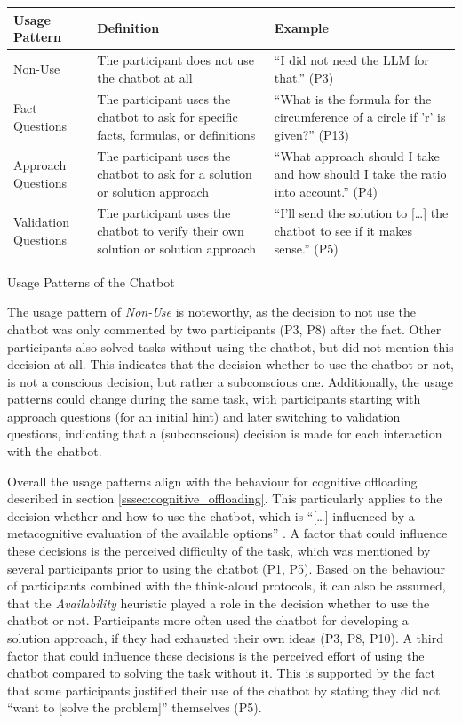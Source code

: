 \begin{ctable}
    \begin{tabularx}{\textwidth}{l|X|X}
        \textbf{Usage Pattern} & \textbf{Definition} & \textbf{Example} \\
        \hline
        Non-Use & The participant does not use the chatbot at all & “I did not need the LLM for that.” (P3) \\
        Fact Questions & The participant uses the chatbot to ask for specific facts, formulas, or definitions & “What is the formula for the circumference of a circle if 'r' is given?” (P13) \\
        Approach Questions & The participant uses the chatbot to ask for a solution or solution approach & “What approach should I take and how should I take the ratio into account.” (P4) \\
        Validation Questions & The participant uses the chatbot to verify their own solution or solution approach & “I'll send the solution to [\dots] the chatbot to see if it makes sense.” (P5)
    \end{tabularx}
    \caption{Usage Patterns of the Chatbot}
    \label{tab:usage_patterns}
\end{ctable}

The usage pattern of \textit{Non-Use} is noteworthy, as the decision to not use the chatbot was only commented by two participants (P3, P8) after the fact. Other participants also solved tasks without using the chatbot, but did not mention this decision at all. This indicates that the decision whether to use the chatbot or not, is not a conscious decision, but rather a subconscious one. Additionally, the usage patterns could change during the same task, with participants starting with approach questions (for an initial hint) and later switching to validation questions, indicating that a (subconscious) decision is made for each interaction with the chatbot.

Overall the usage patterns align with the behaviour for cognitive offloading described in section \ref{sssec:cognitive_offloading}. This particularly applies to the decision whether and how to use the chatbot, which is “[\dots] influenced by a metacognitive evaluation of the available options” \parencite{Risko2015}. A factor that could influence these decisions is the perceived difficulty of the task, which was mentioned by several participants prior to using the chatbot (P1, P5). Based on the behaviour of participants combined with the think-aloud protocols, it can also be assumed, that the \textit{Availability} heuristic \parencite{Tversky1974} played a role in the decision whether to use the chatbot or not. Participants more often used the chatbot for developing a solution approach, if they had exhausted their own ideas (P3, P8, P10). A third factor that could influence these decisions is the perceived effort of using the chatbot compared to solving the task without it. This is supported by the fact that some participants justified their use of the chatbot by stating they did not “want to [solve the problem]” themselves (P5).

